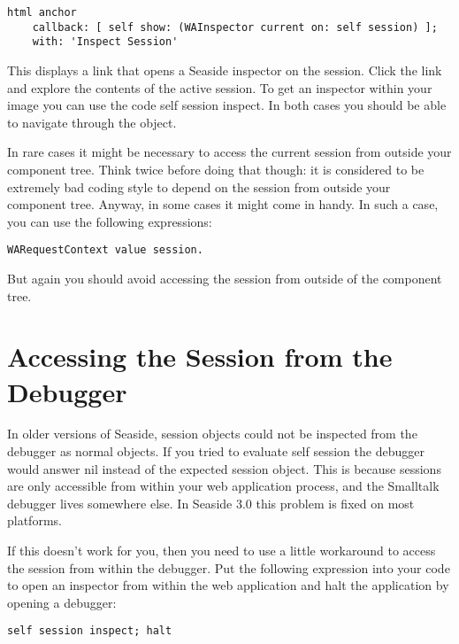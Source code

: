 \documentclass[a4paper,10pt,twoside]{book}
\newcommand{\ct}[1]{{\small\ttfamily\textup{#1}}}
\begin{document}
\begin{lstlisting}
html anchor
    callback: [ self show: (WAInspector current on: self session) ];
    with: 'Inspect Session'
\end{lstlisting}

This displays a link that opens a Seaside inspector on the session. Click the link and explore the contents of the active session. To get an inspector within your image you can use the code \ct{self session inspect}. In both cases you should be able to navigate through the object.

In rare cases it might be necessary to access the current session from outside your component tree. Think twice before doing that though: it is considered to be extremely bad coding style to depend on the session from outside your component tree. Anyway, in some cases it might come in handy. In such a case, you can use the following expressions:  

\begin{lstlisting}
WARequestContext value session.
\end{lstlisting}

But again you should avoid accessing the session from outside of the component tree. 

\section{Accessing the Session from the Debugger}
\label{book:inaction:session:debugger}

In older versions of Seaside, session objects could not be inspected from the debugger as normal objects. If you tried to evaluate \ct{self session} the debugger would answer \ct{nil} instead of the expected session object. This is because sessions are only accessible from within your web application process, and the Smalltalk debugger lives somewhere else. In Seaside 3.0 this problem is fixed on most platforms.

If this doesn't work for you, then you need to use a little workaround to access the session from within the debugger. Put the following expression into your code to open an inspector from within the web application and halt the application by opening a debugger:

\begin{lstlisting}
self session inspect; halt
\end{lstlisting}
\end{document}
